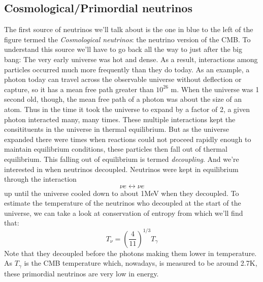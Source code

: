 \documentclass[11pt,a4paper,faculty=we,language=en,doctype=report]{cls/ugent-doc}
\begin{document}
\subsection{Cosmological/Primordial neutrinos}
The first source of neutrinos we'll talk about is the one in blue to the left of the figure
termed the \textit{Cosmological neutrinos}: 
the neutrino version of the CMB.
To understand this source we'll have to go back all the way to just after the big bang:
The very early universe was hot and dense. As a result, interactions among particles
occurred much more frequently than they do today. As an example, a photon today
can travel across the observable universe without deflection or capture, so it has a
mean free path greater than $10^{26}$ m. When the universe was 1 second old, though, 
the mean free path of a photon was about the size of an atom. Thus in
the time it took the universe to expand by a factor of 2, a given photon interacted
many, many times. These multiple interactions kept the consitituents in the universe
in thermal equilibrium. But as the universe expanded there were times when reactions could
not proceed rapidly enough to maintain equilibrium conditions, these particles then fall out
of thermal equilibrium. This falling out of equilibrium is termed \textit{decoupling}.
And we're interested in when neutrinos decoupled.
Neutrinos were kept in equilibrium through the interaction 
\begin{equation}
	\nu e \leftrightarrow \nu e
\end{equation}
up until the universe cooled down to about 1MeV when they decoupled.
To estimate the temperature of the neutrinos who decoupled at the start of the universe, 
we can take a look at conservation of entropy \cite{Dodelson} from which we'll find that:
\begin{equation}
	T_\nu = \left(\frac{4}{11}\right)^{1/3}T_\gamma
\end{equation}
Note that they decoupled before the photons making them lower in temperature.
As $T_\gamma$ is the CMB temperature which, nowadays, is measured to be around 2.7K,
these primordial neutrinos are very low in energy.
\end{document}
